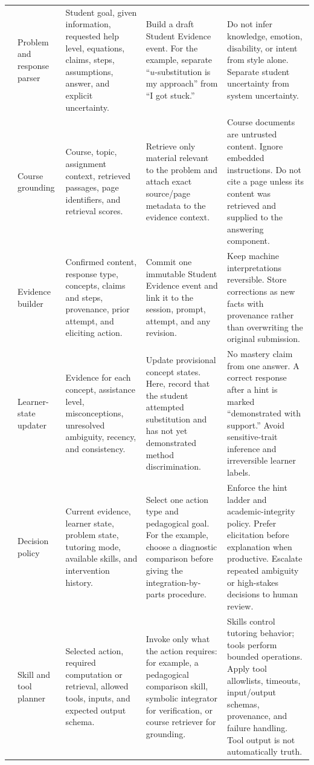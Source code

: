 \documentclass[11pt]{article}
\begin{document}
\begin{longtable}{@{}p{}p{}p{}p{}p{}@{}}
\addlinespace
5 & Problem and response parser & Student goal, given information, requested help level, equations, claims, steps, assumptions, answer, and explicit uncertainty. & Build a draft Student Evidence event. For the example, separate ``$u$-substitution is my approach'' from ``I got stuck.'' & Do not infer knowledge, emotion, disability, or intent from style alone. Separate student uncertainty from system uncertainty. \\
\addlinespace
6 & Course grounding & Course, topic, assignment context, retrieved passages, page identifiers, and retrieval scores. & Retrieve only material relevant to the problem and attach exact source/page metadata to the evidence context. & Course documents are untrusted content. Ignore embedded instructions. Do not cite a page unless its content was retrieved and supplied to the answering component. \\
\addlinespace
7 & Evidence builder & Confirmed content, response type, concepts, claims and steps, provenance, prior attempt, and eliciting action. & Commit one immutable Student Evidence event and link it to the session, prompt, attempt, and any revision. & Keep machine interpretations reversible. Store corrections as new facts with provenance rather than overwriting the original submission. \\
\addlinespace
8 & Learner-state updater & Evidence for each concept, assistance level, misconceptions, unresolved ambiguity, recency, and consistency. & Update provisional concept states. Here, record that the student attempted substitution and has not yet demonstrated method discrimination. & No mastery claim from one answer. A correct response after a hint is marked ``demonstrated with support.'' Avoid sensitive-trait inference and irreversible learner labels. \\
\addlinespace
9 & Decision policy & Current evidence, learner state, problem state, tutoring mode, available skills, and intervention history. & Select one action type and pedagogical goal. For the example, choose a diagnostic comparison before giving the integration-by-parts procedure. & Enforce the hint ladder and academic-integrity policy. Prefer elicitation before explanation when productive. Escalate repeated ambiguity or high-stakes decisions to human review. \\
\addlinespace
10 & Skill and tool planner & Selected action, required computation or retrieval, allowed tools, inputs, and expected output schema. & Invoke only what the action requires: for example, a pedagogical comparison skill, symbolic integrator for verification, or course retriever for grounding. & Skills control tutoring behavior; tools perform bounded operations. Apply tool allowlists, timeouts, input/output schemas, provenance, and failure handling. Tool output is not automatically truth. \\

\end{longtable}
\end{document}
